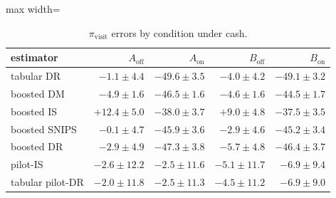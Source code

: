 \begin{table}[!htbp]
\centering
\caption{$\pi_{\mathrm{visit}}$ errors by condition under cash.}
\label{tab:campaignvisit_cash}
\footnotesize
\begin{adjustbox}{max width=\linewidth}
\begin{tabular}{lrrrr}
\toprule
estimator & $A_{\mathrm{off}}$ & $A_{\mathrm{on}}$ & $B_{\mathrm{off}}$ & $B_{\mathrm{on}}$ \\
\midrule
tabular DR & $-1.1 \pm 4.4$ & $-49.6 \pm 3.5$ & $-4.0 \pm 4.2$ & $-49.1 \pm 3.2$ \\
boosted DM & $-4.9 \pm 1.6$ & $-46.5 \pm 1.6$ & $-4.6 \pm 1.6$ & $-44.5 \pm 1.7$ \\
boosted IS & $+12.4 \pm 5.0$ & $-38.0 \pm 3.7$ & $+9.0 \pm 4.8$ & $-37.5 \pm 3.5$ \\
boosted SNIPS & $-0.1 \pm 4.7$ & $-45.9 \pm 3.6$ & $-2.9 \pm 4.6$ & $-45.2 \pm 3.4$ \\
boosted DR & $-2.9 \pm 4.9$ & $-47.3 \pm 3.8$ & $-5.7 \pm 4.8$ & $-46.4 \pm 3.7$ \\
pilot-IS & $-2.6 \pm 12.2$ & $-2.5 \pm 11.6$ & $-5.1 \pm 11.7$ & $-6.9 \pm 9.4$ \\
tabular pilot-DR & $-2.0 \pm 11.8$ & $-2.5 \pm 11.3$ & $-4.5 \pm 11.2$ & $-6.9 \pm 9.0$ \\
\bottomrule
\end{tabular}
\end{adjustbox}
\end{table}
